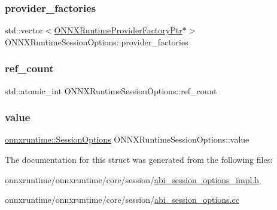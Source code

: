 \subsubsection{\texorpdfstring{provider\+\_\+factories}{provider\_factories}}
{\footnotesize\ttfamily std\+::vector$<$\mbox{\hyperlink{session__options__c__api_8h_a351bab8a857e0f355c92af5c22b759bc}{O\+N\+N\+X\+Runtime\+Provider\+Factory\+Ptr}}$\ast$$>$ O\+N\+N\+X\+Runtime\+Session\+Options\+::provider\+\_\+factories}

\mbox{\label{structONNXRuntimeSessionOptions_a7b75fb8af22d1bab4d3b78d560e59a99}} 
\subsubsection{\texorpdfstring{ref\+\_\+count}{ref\_count}}
{\footnotesize\ttfamily std\+::atomic\+\_\+int O\+N\+N\+X\+Runtime\+Session\+Options\+::ref\+\_\+count}

\mbox{\label{structONNXRuntimeSessionOptions_a5e7a9bf1617d454a8fc7859c6bb2bf0c}} 
\subsubsection{\texorpdfstring{value}{value}}
{\footnotesize\ttfamily \mbox{\hyperlink{structonnxruntime_1_1SessionOptions}{onnxruntime\+::\+Session\+Options}} O\+N\+N\+X\+Runtime\+Session\+Options\+::value}



The documentation for this struct was generated from the following files\+:\begin{DoxyCompactItemize}
\item 
onnxruntime/onnxruntime/core/session/\mbox{\hyperlink{abi__session__options__impl_8h}{abi\+\_\+session\+\_\+options\+\_\+impl.\+h}}\item 
onnxruntime/onnxruntime/core/session/\mbox{\hyperlink{abi__session__options_8cc}{abi\+\_\+session\+\_\+options.\+cc}}\end{DoxyCompactItemize}
